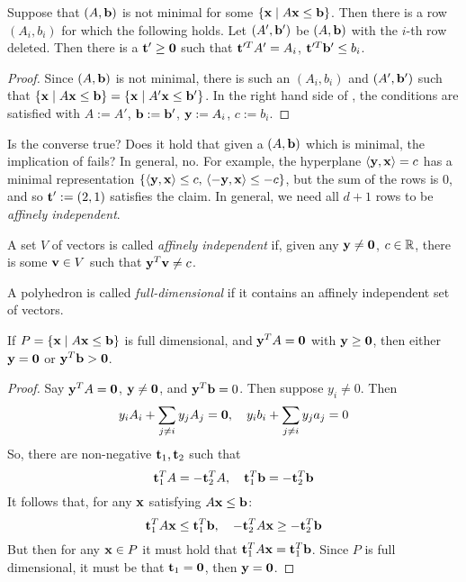 \begin{Prop}\label{ab_not_minimal}
	Suppose that $(A,\mathbf{b})$ is not minimal for some $\left\{\mathbf{x}\;|\; A\mathbf{x}\leq \mathbf{b}\right\}$.  Then there is a row $(A_i,b_i)$ for which the following holds.  Let $(A',\mathbf{b}')$ be $(A,\mathbf{b})$ with the $i$-th row deleted.  Then there is a $\mathbf{t}'\geq\mathbf{0}$ such that $\mathbf{t}'^T A' = A_i$, $\mathbf{t}'^T \mathbf{b}' \leq b_i$.
\end{Prop}

\begin{proof}
	Since $(A,\mathbf{b})$ is not minimal, there is such an $(A_i,b_i)$ and $(A',\mathbf{b}')$ such that $\left\{\mathbf{x}\;|\; A\mathbf{x}\leq \mathbf{b}\right\} = \left\{\mathbf{x}\;|\; A'\mathbf{x}\leq \mathbf{b}'\right\}$.  In the right hand side of , the conditions are satisfied with $A := A'$, $\mathbf{b} := \mathbf{b}'$, $\mathbf{y} := A_i$, $c := b_i$.
\end{proof}

Is the converse true?  Does it hold that given a $(A,\mathbf{b})$ which is minimal, the implication of  fails?  In general, no.  For example, the hyperplane $\left\langle \mathbf{y}, \mathbf{x} \right\rangle = c$ has a minimal representation $\left\{\left\langle \mathbf{y}, \mathbf{x} \right\rangle\leq c,\,\left\langle -\mathbf{y}, \mathbf{x} \right\rangle\leq -c\right\}$, but the sum of the rows is $0$, and so $\mathbf{t}':= (2,1)$ satisfies the claim.  In general, we need all $d+1$ rows to be \textit{affinely independent}.

\begin{Def}
	A set $V$ of vectors is called \textit{affinely independent} if, given any $\mathbf{y}\neq\mathbf{0}$, $c\in\mathbb{R}$, there is some $\mathbf{v}\in V$ such that $\mathbf{y}^T\mathbf{v} \neq c$.
\end{Def}

\begin{Def}
	A polyhedron is called \textit{full-dimensional} if it contains an affinely independent set of vectors.
\end{Def}

\begin{Prop}\label{ab_full_dim}
	If $P = \left\{\mathbf{x}\;|\; A\mathbf{x}\leq \mathbf{b}\right\}$ is full dimensional, and $\mathbf{y}^T A = \mathbf{0}$ with $\mathbf{y}\geq\mathbf{0}$, then either $\mathbf{y} = \mathbf{0}$ or $\mathbf{y}^T \mathbf{b} > \mathbf{0}$.
\end{Prop}

\begin{proof}
	Say $\mathbf{y}^T A = \mathbf{0}$, $\mathbf{y} \neq \mathbf{0}$, and $\mathbf{y}^T\mathbf{b} = 0$.  Then suppose $y_i \neq 0$.  Then
	\[y_i A_i + \sum_{j\neq i}y_j A_j = \mathbf{0},\quad y_i b_i + \sum_{j\neq i} y_j a_j = 0 \]
	So, there are non-negative $\mathbf{t}_1,\mathbf{t}_2$ such that
	\[\mathbf{t}_1^T A = -\mathbf{t}_2^T A,\quad \mathbf{t}_1^T\mathbf{b} = -\mathbf{t}_2^T\mathbf{b}\]
	It follows that, for any $\mathbf{x}$ satisfying $A\mathbf{x}\leq\mathbf{b}$:
  \[ \mathbf{t}_1^T A\mathbf{x} \leq \mathbf{t}_1^T \mathbf{b},\quad -\mathbf{t}_2^T A\mathbf{x} \geq -\mathbf{t}_2^T \mathbf{b} \]
  But then for any $\mathbf{x}\in P$ it must hold that $\mathbf{t}_1^T A \mathbf{x} = \mathbf{t}_1^T \mathbf{b}$.  Since $P$ is full dimensional, it must be that $\mathbf{t}_1 = \mathbf{0}$, then $\mathbf{y} = \mathbf{0}$.
\end{proof}

